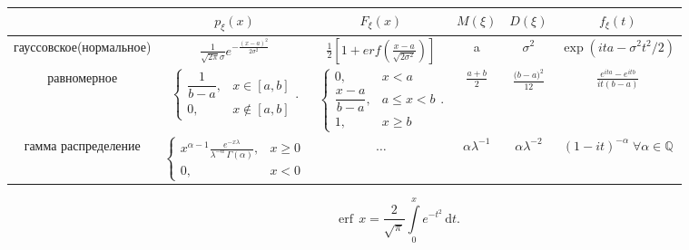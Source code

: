\documentclass[a4paper]{article}
\theoremstyle{definition}
\theoremstyle{remark}
\begin{document}
\begin{center}
    \begin{tabular}{ | c |c c c c c| }
        \hline
        $ $ & $p_\xi(x)$ & $F_\xi(x)$ & $M(\xi)$ & $D(\xi)$ & $f_\xi(t)$\\ 
        \hline
        гауссовское(нормальное) & $\frac1{\sqrt{2\pi}\sigma} e^{-\frac{(x-a)^2}{2\sigma^2}}$ & $\frac12 [1 + erf(\frac{x-a}{\sqrt{2\sigma^2}})]$ & a  & $\sigma^2$ & $\exp (ita - \sigma^2 t^2/2)$\\ 
        
        равномерное & ${\displaystyle\left\{{\begin{matrix}{\dfrac {1}{b-a}},&x\in [a,b]\\0,&x\not \in [a,b]\end{matrix}}\right..}$ &
        ${\displaystyle \left\{{\begin{matrix}0,&x<a\\{\dfrac {x-a}{b-a}},&a\leqslant x<b\\1,&x\geqslant b\end{matrix}}\right..}$ &
        $\frac{a+b}2$ & $\frac{{(b-a})^2}{12}$ & $ \frac{e^{ita} - e^{itb}}{it (b-a)}$ \\


        гамма распределение & $\displaystyle\left\{{\begin{matrix}x^{{\alpha-1}}{\frac  {e^{{-x\lambda }}}{\lambda ^{-\alpha}\,\Gamma (\alpha)}},&x\geq 0\\0,&x<0\end{matrix}}\right.$ & $\dots$ & $\alpha \lambda^{-1}$ & $\alpha \lambda^{-2}$ & $ (1-it)^{-\alpha} \; \forall \alpha \in \mathbb{Q}$\\
        
     \hline
    \end{tabular}
    \end{center}
    \[\operatorname {erf}\,x={\frac  {2}{{\sqrt  {\pi }}}}\int \limits _{0}^{x}e^{{-t^{2}}}\,{\mathrm  d}t.\]
\end{document}
